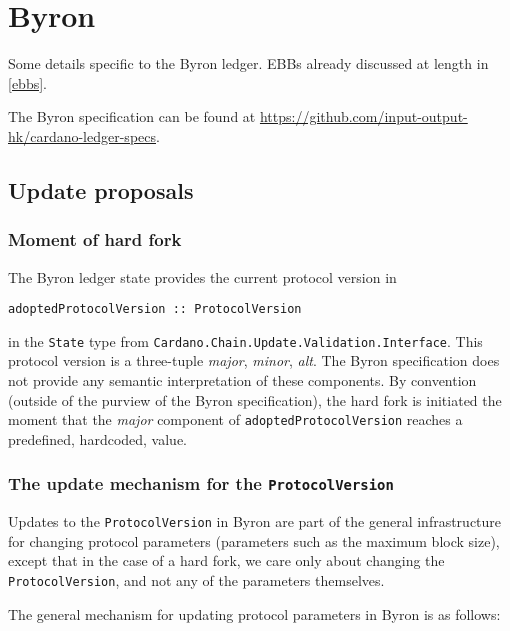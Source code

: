 \chapter{Byron}

Some details specific to the Byron ledger.
EBBs already discussed at length in \cref{ebbs}.

The Byron specification can be found at \url{https://github.com/input-output-hk/cardano-ledger-specs}.

\section{Update proposals}
\label{byron:hardfork}

\subsection{Moment of hard fork}
\label{byron:hardfork:moment}

The Byron ledger state provides the current protocol version in
%
\begin{lstlisting}
adoptedProtocolVersion :: ProtocolVersion
\end{lstlisting}
%
in the \lstinline!State! type from
\lstinline!Cardano.Chain.Update.Validation.Interface!.
This protocol version is a three-tuple \emph{major}, \emph{minor}, \emph{alt}.
The Byron specification does not provide any semantic interpretation of these
components. By convention (outside of the purview of the Byron specification),
the hard fork is initiated the moment that the \emph{major} component of
\lstinline!adoptedProtocolVersion! reaches a predefined, hardcoded, value.

\subsection{The update mechanism for the \lstinline!ProtocolVersion!}

Updates to the \lstinline!ProtocolVersion! in Byron are part of the general
infrastructure for changing protocol parameters (parameters such as the maximum
block size), except that in the case of a hard fork, we care only about changing
the \lstinline!ProtocolVersion!, and not any of the parameters themselves.

The general mechanism for updating protocol parameters in Byron is as follows:

